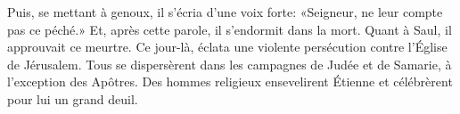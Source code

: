 Puis, se mettant à genoux, il s’écria d’une voix forte:
	«Seigneur, ne leur compte pas ce péché.»
Et, après cette parole, il s’endormit dans la mort.
Quant à Saul, il approuvait ce meurtre.
Ce jour-là, éclata une violente persécution contre l’Église de Jérusalem.
	Tous se dispersèrent dans les campagnes de Judée et de Samarie,
	à l’exception des Apôtres.
Des hommes religieux ensevelirent Étienne et célébrèrent pour lui un grand deuil.
